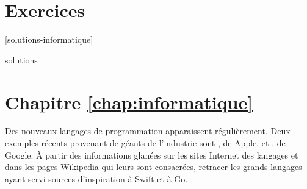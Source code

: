 \section{Exercices}
\label{operateurs:exercices}

[solutions-informatique]

\begin{Filesave}{solutions}
\section*{Chapitre \ref*{chap:informatique}}

\end{Filesave}

\begin{exercice}[nosol]
  Des nouveaux langages de programmation apparaissent régulièrement.
  Deux exemples récents provenant de géants de l'industrie sont
  , de Apple, et
  , de Google. À partir des informations
  glanées sur les sites Internet des langages et dans les pages
  Wikipedia qui leurs sont consacrées, retracer les grands langages
  ayant servi sources d'inspiration à Swift et à
  Go.
\end{exercice}

